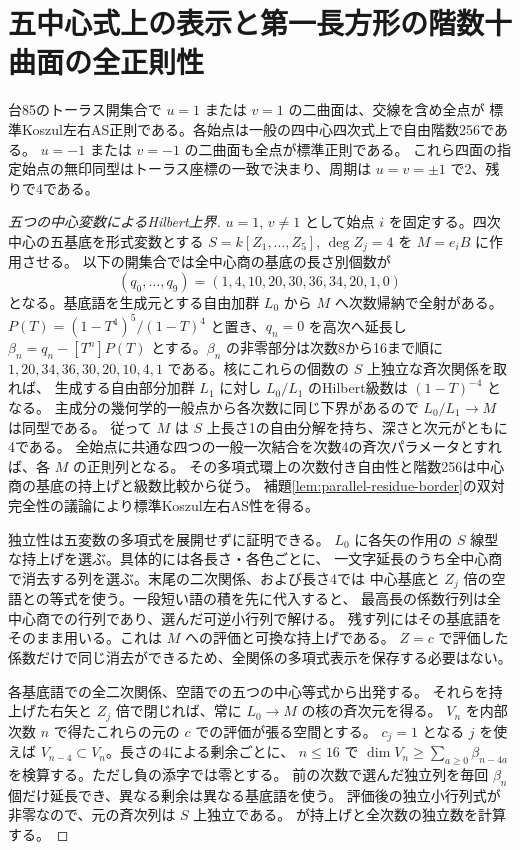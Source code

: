 \section{五中心式上の表示と第一長方形の階数十曲面の全正則性}
\label{sec:first-rectangle-edge-regularity}
\begin{theorem}\label{thm:first-rectangle-edge-regularity}
台85のトーラス開集合で $u=1$ または $v=1$ の二曲面は、交線を含め全点が
標準Koszul左右AS正則である。各始点は一般の四中心四次式上で自由階数256である。
$u=-1$ または $v=-1$ の二曲面も全点が標準正則である。
これら四面の指定始点の無印同型はトーラス座標の一致で決まり、周期は
$u=v=\pm1$ で2、残りで4である。
\end{theorem}

\begin{proof}[五つの中心変数によるHilbert上界]
$u=1$, $v\ne1$ として始点 $i$ を固定する。四次中心の五基底を形式変数とする
$S=k[Z_1,\ldots,Z_5]$, $\deg Z_j=4$ を $M=e_iB$ に作用させる。
以下の開集合では全中心商の基底の長さ別個数が
\[
 (q_0,\ldots,q_9)=(1,4,10,20,30,36,34,20,1,0)
\]
となる。基底語を生成元とする自由加群 $L_0$ から $M$ へ次数帰納で全射がある。
$P(T)=(1-T^4)^5/(1-T)^4$ と置き、$q_n=0$ を高次へ延長し
$\beta_n=q_n-[T^n]P(T)$ とする。$\beta_n$ の非零部分は次数8から16まで順に
$1,20,34,36,30,20,10,4,1$ である。核にこれらの個数の $S$ 上独立な斉次関係を取れば、
生成する自由部分加群 $L_1$ に対し $L_0/L_1$ のHilbert級数は $(1-T)^{-4}$ となる。
主成分の幾何学的一般点から各次数に同じ下界があるので $L_0/L_1\to M$ は同型である。
従って $M$ は $S$ 上長さ1の自由分解を持ち、深さと次元がともに4である。
全始点に共通な四つの一般一次結合を次数4の斉次パラメータとすれば、各 $M$ の正則列となる。
その多項式環上の次数付き自由性と階数256は中心商の基底の持上げと級数比較から従う。
補題\ref{lem:parallel-residue-border}の双対完全性の議論により標準Koszul左右AS性を得る。

独立性は五変数の多項式を展開せずに証明できる。
$L_0$ に各矢の作用の $S$ 線型な持上げを選ぶ。具体的には各長さ・各色ごとに、
一文字延長のうち全中心商で消去する列を選ぶ。末尾の二次関係、および長さ4では
中心基底と $Z_j$ 倍の空語との等式を使う。一段短い語の積を先に代入すると、
最高長の係数行列は全中心商での行列であり、選んだ可逆小行列で解ける。
残す列にはその基底語をそのまま用いる。これは $M$ への評価と可換な持上げである。
$Z=c$ で評価した係数だけで同じ消去ができるため、全関係の多項式表示を保存する必要はない。

各基底語での全二次関係、空語での五つの中心等式から出発する。
それらを持上げた右矢と $Z_j$ 倍で閉じれば、常に $L_0\to M$ の核の斉次元を得る。
$V_n$ を内部次数 $n$ で得たこれらの元の $c$ での評価が張る空間とする。
$c_j=1$ となる $j$ を使えば $V_{n-4}\subset V_n$。長さの4による剰余ごとに、
$n\le16$ で $\dim V_n\ge\sum_{a\ge0}\beta_{n-4a}$ を検算する。ただし負の添字では零とする。
前の次数で選んだ独立列を毎回 $\beta_n$ 個だけ延長でき、異なる剰余は異なる基底語を使う。
評価後の独立小行列式が非零なので、元の斉次列は $S$ 上独立である。
 が持上げと全次数の独立数を計算する。
\end{proof}

